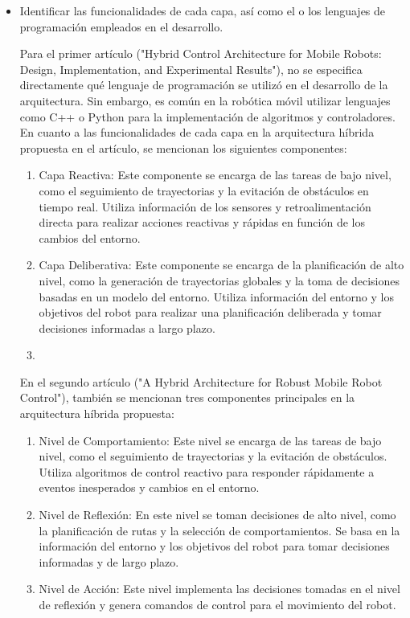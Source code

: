 \documentclass{article}
\begin{document}
\begin{itemize}
\item{Identificar las funcionalidades de cada capa, así como el o los lenguajes de programación empleados en el desarrollo.}

  Para el primer artículo ("Hybrid Control Architecture for Mobile Robots: Design, Implementation, and Experimental Results"), no se especifica directamente qué lenguaje de programación se utilizó en el desarrollo de la arquitectura. Sin embargo, es común en la robótica móvil utilizar lenguajes como C++ o Python para la implementación de algoritmos y controladores.\\

  En cuanto a las funcionalidades de cada capa en la arquitectura híbrida propuesta en el artículo, se mencionan los siguientes componentes:\\

  \begin{enumerate}
  \item Capa Reactiva: Este componente se encarga de las tareas de bajo nivel, como el seguimiento de trayectorias y la evitación de obstáculos en tiempo real. Utiliza información de los sensores y retroalimentación directa para realizar acciones reactivas y rápidas en función de los cambios del entorno.
  \item Capa Deliberativa: Este componente se encarga de la planificación de alto nivel, como la generación de trayectorias globales y la toma de decisiones basadas en un modelo del entorno. Utiliza información del entorno y los objetivos del robot para realizar una planificación deliberada y tomar decisiones informadas a largo plazo.
  \item 
  \end{enumerate}

  En el segundo artículo ("A Hybrid Architecture for Robust Mobile Robot Control"), también se mencionan tres componentes principales en la arquitectura híbrida propuesta:\\

  \begin{enumerate}
  \item Nivel de Comportamiento: Este nivel se encarga de las tareas de bajo nivel, como el seguimiento de trayectorias y la evitación de obstáculos. Utiliza algoritmos de control reactivo para responder rápidamente a eventos inesperados y cambios en el entorno.
  \item Nivel de Reflexión: En este nivel se toman decisiones de alto nivel, como la planificación de rutas y la selección de comportamientos. Se basa en la información del entorno y los objetivos del robot para tomar decisiones informadas y de largo plazo.
  \item Nivel de Acción: Este nivel implementa las decisiones tomadas en el nivel de reflexión y genera comandos de control para el movimiento del robot.
  \end{enumerate}


\end{itemize}
\end{document}
